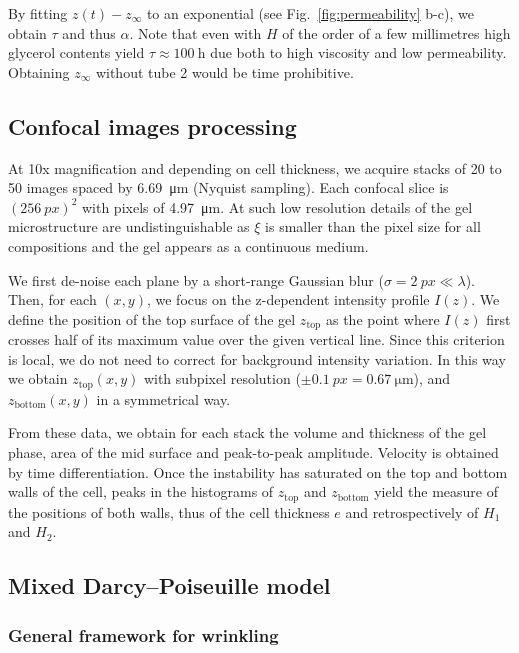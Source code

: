 \documentclass[twocolumn,superscriptaddress,showpacs,preprintnumbers,
amsmath,amssymb,prl]{revtex4-1}
\begin{document}
By fitting $z(t)-z_\infty$ to an exponential (see Fig.~\ref{fig:permeability} b-c), we obtain $\tau$ and thus $\alpha$. Note that even with $H$ of the order of a few millimetres high glycerol contents yield $\tau\approx \SI{100}{\hour}$ due both to high viscosity and low permeability. Obtaining $z_\infty$ without tube 2 would be time prohibitive.



\subsection*{Confocal images processing}

At 10x magnification and depending on cell thickness, we acquire stacks of 20 to 50 images spaced by \SI{6.69}{\micro\metre} (Nyquist sampling). Each confocal slice is $(\SI{256}{px})^2$ with pixels of \SI{4.97}{\micro\metre}. At such low resolution details of the gel microstructure are undistinguishable as $\xi$ is smaller than the pixel size for all compositions and the gel appears as a continuous medium.

We first de-noise each plane by a short-range Gaussian blur ($\sigma=\SI{2}{px}\ll\lambda$). Then, for each $(x,y)$, we focus on the z-dependent intensity profile $I(z)$. We define the position of the top surface of the gel $z_\text{top}$ as the point where $I(z)$ first crosses half of its maximum value over the given vertical line. Since this criterion is local, we do not need to correct for background intensity variation. In this way we obtain $z_\text{top}(x,y)$ with subpixel resolution ($\pm\SI{0.1}{px}=\SI{0.67}{\micro\metre}$), and $z_\text{bottom}(x,y)$ in a symmetrical way.

From these data, we obtain for each stack the volume and thickness of the gel phase, area of the mid surface and peak-to-peak amplitude. Velocity is obtained by time differentiation. Once the instability has saturated on the top and bottom walls of the cell, peaks in the histograms of $z_\text{top}$ and $z_\text{bottom}$ yield the measure of the positions of both walls, thus of the cell thickness $e$ and retrospectively of $H_1$ and $H_2$.



\subsection*{Mixed Darcy--Poiseuille model}

\subsubsection*{General framework for wrinkling}
\end{document}

